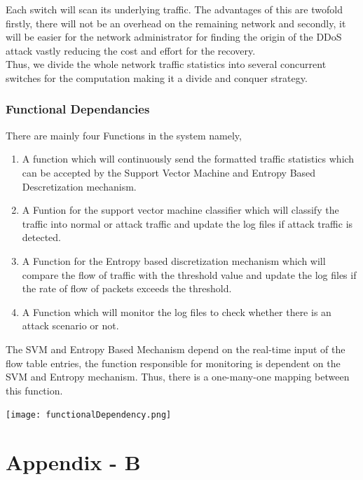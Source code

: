 \documentclass[12pt,a4paper,final]{report}
\DeclareRobustCommand{\gobblefive}[5]{}
\newcommand*{\SkipTocEntry}{\addtocontents{toc}{\gobblefive}}
\begin{document}
{{{{Each switch will scan its underlying traffic. The advantages of this are twofold firstly, there will not be an overhead on the remaining network and secondly, it will be easier for the network administrator for finding the origin of the DDoS attack vastly reducing the cost and effort for the recovery. \\

Thus, we divide the whole network traffic statistics into several concurrent switches for the computation making it a divide and conquer strategy.

\SkipTocEntry\subsection{Functional Dependancies}
There are mainly four Functions in the system namely,
\begin{enumerate}
\item
A function which will continuously send the formatted traffic statistics which can be accepted by the Support Vector Machine and Entropy Based Descretization mechanism.
\item
A Funtion for the support vector machine classifier which will classify the traffic into normal or attack traffic and update the log files if attack traffic is detected.
\item
A Function for the Entropy based discretization mechanism which will compare the flow of traffic with the threshold value and update the log files if the rate of flow of packets exceeds the threshold.
\item
A Function which will monitor the log files to check whether there is an attack scenario or not.
\end{enumerate}
The SVM and Entropy Based Mechanism depend on the real-time input of the flow table entries, the function responsible for monitoring is dependent on the SVM and Entropy mechanism. Thus, there is a one-many-one mapping between this function.
\begin{center}
\texttt{[image: functionalDependency.png]}
\end{center}
\newpage

\SkipTocEntry\chapter{Appendix - B}
\thispagestyle{empty}
\newpage

}}}}
\end{document}
